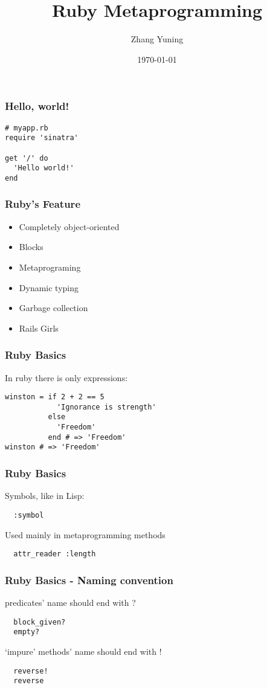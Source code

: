 \documentclass[11pt]{beamer}
\begin{document}
\title{Ruby Metaprogramming}
\author{Zhang Yuning}
\date{\today}
\begin{frame}
\titlepage
\end{frame}

\begin{frame}[fragile]
\frametitle{Hello, world!}
\begin{verbatim}
# myapp.rb
require 'sinatra'

get '/' do
  'Hello world!'
end
\end{verbatim}
\end{frame}

\begin{frame}
\frametitle{Ruby's Feature}
\begin{itemize}
\item Completely object-oriented
\item Blocks
\item Metaprograming
\item Dynamic typing
\item Garbage collection
\item Rails Girls
\end{itemize}
\end{frame}

\begin{frame}[fragile]
\frametitle{Ruby Basics}
In ruby there is only expressions:
\begin{verbatim}
winston = if 2 + 2 == 5
            'Ignorance is strength'
          else
            'Freedom'
          end # => 'Freedom'
winston # => 'Freedom'
\end{verbatim}
\end{frame}

\begin{frame}[fragile]
\frametitle{Ruby Basics}
Symbols, like in Lisp:
\begin{verbatim}
  :symbol
\end{verbatim}
Used mainly in metaprogramming methods
\begin{verbatim}
  attr_reader :length
\end{verbatim}
\end{frame}

\begin{frame}[fragile]
\frametitle{Ruby Basics - Naming convention}
predicates' name should end with ?
\begin{verbatim}
  block_given?
  empty?
\end{verbatim}
`impure' methods' name should end with !
\begin{verbatim}
  reverse!
  reverse
\end{verbatim}
\end{frame}
\end{document}
